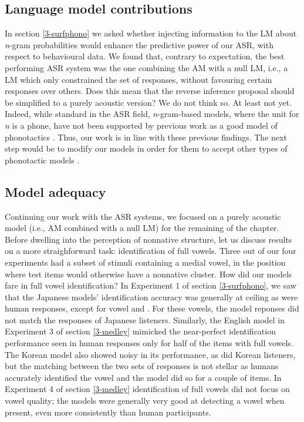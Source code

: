 {\subsection{Language model contributions} 
In section \ref{3-surfphono} we asked whether injecting information to the LM about \textit{n}-gram probabilities would enhance the predictive power of our ASR, with respect to behavioural data. We found that, contrary to expectation, the best performing ASR system was the one combining the AM with a null LM, i.e., a LM which only constrained the set of responses, without favouring certain responses over others. Does this mean that the reverse inference proposal should be simplified to a purely acoustic version? We do not think so. At least not yet. Indeed, while standard in the ASR field, \textit{n}-gram-based models, where the unit for \textit{n} is a phone, have not been supported by previous work as a good model of phonotactics \cite{hayes2008}. Thus, our work is in line with these previous findings. The next step would be to modify our models in order for them to accept other types of phonotactic models \cite{hayes2008, albright2009}.        
\subsection{Model adequacy}
Continuing our work with the ASR systems, we focused on a purely acoustic model (i.e., AM combined with a null LM) for the remaining of the chapter. Before dwelling into the perception of nonnative structure, let us discuss results on a more straighforward task: identification of full vowels. Three out of our four experiments had a subset of stimuli containing a medial vowel, in the position where test items would otherwise have a nonnative cluster. How did our models fare in full vowel identification? In Experiment 1 of section \ref{3-surfphono}, we saw that the Japanese models' identification accuracy was generally at ceiling as were human responses, except for vowel  and . For these vowels, the model reponses did not match the responses of Japanese listeners. Similarly, the English model in Experiment 3 of section \ref{3-medley} mimicked the near-perfect identification performance seen in human responses only for half of the items with full vowels. The Korean model also showed noisy in its performance, as did Korean listeners, but the matching between the two sets of responses is not stellar as humans accurately identified the vowel  and the model did so for a couple of items. In Experiment 4 of section \ref{3-medley} identification of full vowels did not focus on vowel quality; the models were generally very good at detecting a vowel when present, even more consistently than human participants.      

}
